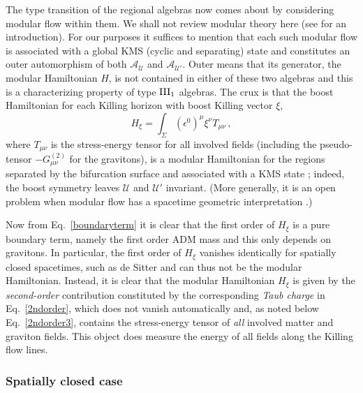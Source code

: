 \documentclass[]{jkpaper}
\theoremstyle{plain}
\theoremstyle{definition}
\begin{document}
The type transition of the regional algebras now comes about by considering modular flow within them. We shall not review modular theory here (see \cite{haag2012local,WittenRevModPhys.90.045003} for an introduction). For our purposes it suffices to mention that each such modular flow is associated with a global KMS (cyclic and separating) state and constitutes an outer automorphism of both $\mathcal{A}_{\mathcal{U}}$ and $\mathcal{A}_{\mathcal{U}'}$. Outer means that its generator, the modular Hamiltonian $H$, is not contained in either of these two algebras and this is a characterizing property of type $\rm{III}_1$ algebras. The crux is that the boost Hamiltonian for each Killing horizon with boost Killing vector $\xi$,
\begin{equation}\label{boost}
    H_\xi = \int_\Sigma(\epsilon^0)^\mu\xi^\nu T_{\mu \nu}\,,
\end{equation}
where $T_{\mu \nu}$ is the stress-energy tensor for all involved fields (including the pseudo-tensor $-G^{(2)}_{\mu\nu}$ for the gravitons), is a modular Hamiltonian  for the regions separated by the bifurcation surface and associated with a KMS state \cite{Bisognano:1975ih,Sewell:1982zz,sorce2024analyticity}; indeed, the boost symmetry leaves $\mathcal{U}$ and $\mathcal{U}'$ invariant. (More generally, it is an open problem when modular flow has a spacetime geometric interpretation \cite{sorce2024analyticity}.)

Now from Eq.~\eqref{boundaryterm} it is clear that the first order of $H_\xi$ is a pure boundary term, namely the first order ADM mass and this only depends on gravitons. In particular, the first order of $H_\xi$ vanishes identically for spatially closed spacetimes, such as de Sitter and can thus not be the modular Hamiltonian.
Instead, it is clear that the modular Hamiltonian $H_\xi$ is given by the \emph{second-order} contribution constituted by the corresponding \emph{Taub charge} in Eq.~\eqref{2ndorder}, which does not vanish automatically and, as noted below Eq.~\eqref{2ndorder3}, contains the stress-energy tensor of \emph{all} involved matter and graviton fields. This object does measure the energy of all fields along the Killing flow lines.


\subsubsection{Spatially closed case}
\end{document}
